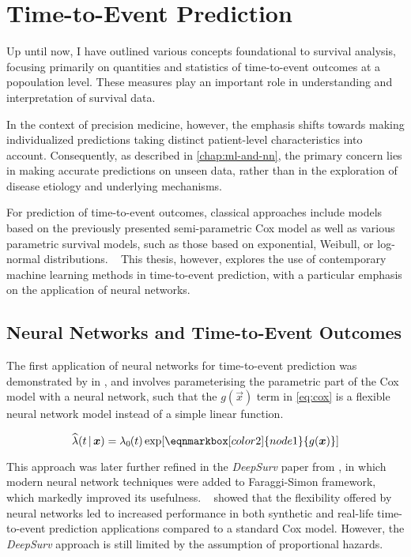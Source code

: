 \section{Time-to-Event Prediction}

Up until now, 
I have outlined various concepts foundational to survival analysis,
focusing primarily on quantities and statistics of time-to-event outcomes
at a popoulation level.
These measures play an important role in understanding 
and interpretation of survival data.

In the context of precision medicine, however,
the emphasis shifts towards making individualized predictions
taking distinct patient-level characteristics into account.
Consequently, as described in \cref{chap:ml-and-nn}, 
the primary concern lies in 
making accurate predictions on unseen data,
rather than in the exploration of disease etiology and underlying mechanisms.

For prediction of time-to-event outcomes, classical approaches 
include models based on the previously presented semi-parametric Cox model 
as well as various parametric survival models, 
such as those based on exponential, Weibull, or log-normal distributions.
~\autocite{kleinSurvival2003}
This thesis, however, 
explores the use of contemporary machine learning methods 
in time-to-event prediction,
with a particular emphasis on the application of neural networks.

\subsection{Neural Networks and Time-to-Event Outcomes}

The first application of neural networks for time-to-event prediction
was demonstrated by
\citeauthor{faraggiNeural1995} in
\citeyear{faraggiNeural1995},
and involves parameterising the parametric part of the Cox model
with a neural network, 
such that the \(g(\vec{x})\) term in \cref{eq:cox} is a 
flexible neural network model instead of a simple linear function.
\autocite{faraggiNeural1995}

\vspace{.5em}
\begin{equation*}
    \widehat{\lambda} (t \,|\, \vec{x}) = \hzt \exp [
    \eqnmarkbox[color2]{node1}{
        g(\vec{x})
    }]
\end{equation*}

This approach was later further refined
in the \emph{DeepSurv} paper from 
\citeyear{katzmanDeepSurv2018a},
in which modern neural network techniques
were added to Faraggi-Simon framework, 
which markedly improved its usefulness.
~\autocite{katzmanDeepSurv2018a}
\citeauthor{katzmanDeepSurv2018a} showed that the flexibility 
offered by neural networks led to increased performance
in both synthetic and real-life time-to-event prediction applications
compared to a standard Cox model.
However, the \emph{DeepSurv} approach is still limited by the 
assumption of proportional hazards.

